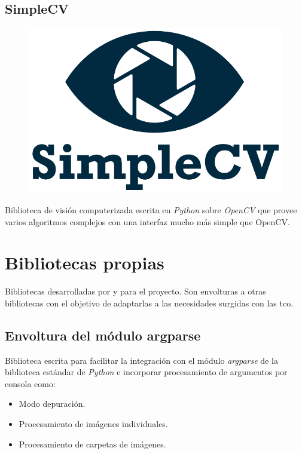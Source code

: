 \subsection{SimpleCV}
\begin{figure}[H]
  \hspace*{1.7cm}
  \includegraphics[scale=0.3]{imagenes/logos/simplecv_logo.png}
\end{figure}
Biblioteca de visión computerizada escrita en \emph{Python} sobre
\emph{OpenCV} que provee varios algoritmos complejos con una interfaz
mucho más simple que OpenCV\@.

\section{Bibliotecas propias}

Bibliotecas desarrolladas por y para el proyecto. Son envolturas a
otras bibliotecas con el objetivo de adaptarlas a las necesidades
surgidas con las \gls{tco}.

\subsection{Envoltura del módulo argparse}
Biblioteca escrita para facilitar la integración con el módulo
\emph{argparse} de la biblioteca estándar de \emph{Python} e
incorporar procesamiento de argumentos por consola como:
\begin{itemize}
\item Modo depuración.
\item Procesamiento de imágenes individuales.
\item Procesamiento de carpetas de imágenes.
\end{itemize}

